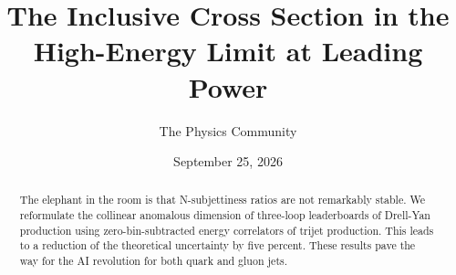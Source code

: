 \documentclass[11pt]{article}
\title{The Inclusive Cross Section in the High-Energy Limit at Leading Power}
\author{The Physics Community}
\date{September 25, 2026}
\begin{document}
\maketitle
\begin{abstract}
The elephant in the room is that N-subjettiness ratios are not
remarkably stable. We reformulate the collinear anomalous dimension of
three-loop leaderboards of Drell-Yan production using
zero-bin-subtracted energy correlators of trijet production. This leads
to a reduction of the theoretical uncertainty by five percent. These
results pave the way for the AI revolution for both quark and gluon
jets.
\end{abstract}
\tableofcontents



\nocite{*}


\end{document}
